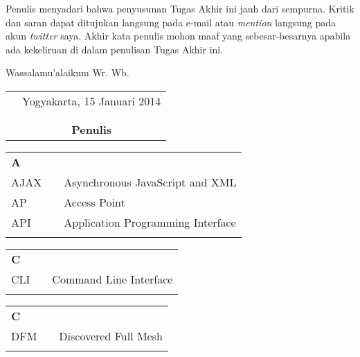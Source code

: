 \documentclass{jtetiskripsi}
\begin{document}
Penulis menyadari bahwa penyusunan Tugas Akhir ini jauh dari sempurna. Kritik dan saran dapat ditujukan langsung pada e-mail atau \emph{mention} langsung pada akun \emph{twitter} saya. Akhir kata penulis mohon maaf yang sebesar-besarnya apabila ada kekeliruan di dalam penulisan Tugas Akhir ini.

\vspace{0.5cm}

Wassalamu'alaikum Wr. Wb.

\begin{tabular}{p{7.5cm}c}
&Yogyakarta, 15 Januari 2014\\
&\\
&\\
&\textbf{Penulis}
\end{tabular}

\tableofcontents
{}
\listoftables
{}
\listoffigures
{}

\singkatan
\noindent

\begin{tabular}{p{20pt}p{3pt}l}
\textbf{A}\\
AJAX & & Asynchronous JavaScript and XML\\
AP & & Access Point\\
API & & Application Programming Interface\\
\\
\end{tabular}

\begin{tabular}{p{20pt}p{3pt}l}
\textbf{C}\\
CLI & & Command Line Interface\\
\\
\end{tabular}

\begin{tabular}{p{20pt}p{3pt}l}
\textbf{C}\\
DFM & & Discovered Full Mesh\\
\\
\end{tabular}
\end{document}
